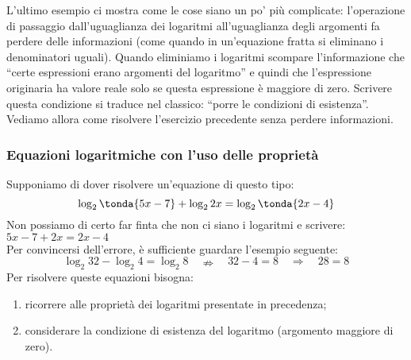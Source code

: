 L'ultimo esempio ci mostra come le cose siano un po' più complicate: 
l'operazione di passaggio dall'uguaglianza dei logaritmi all'uguaglianza 
degli argomenti fa perdere delle informazioni (come quando in un'equazione 
fratta si eliminano i denominatori uguali). 
Quando eliminiamo i logaritmi scompare l'informazione che ``certe 
espressioni erano argomenti del logaritmo'' e quindi che l'espressione 
originaria ha valore reale solo se questa espressione è maggiore di zero. 
Scrivere questa condizione si traduce nel classico: ``porre le condizioni 
di esistenza''.
Vediamo allora come risolvere l'esercizio precedente senza perdere 
informazioni.



\subsubsection{Equazioni logaritmiche con l'uso delle proprietà}
\label{subsubsec:esplog_eq_log_proprieta}

\noindent Supponiamo di dover risolvere un'equazione di questo tipo:
\[\log_2\tonda{5x -7} + \log_2{2x}= \log_2\tonda{2x -4}\]
Non possiamo di certo far finta che non ci siano i logaritmi e scrivere:
\(5x -7 + 2x = 2x -4\)\\
Per convincersi dell'errore, è sufficiente guardare l'esempio seguente:
\[\log_2 32 -\log_2 4 = \log_2 8 \quad \nRightarrow\quad 32 -4 = 8 \quad 
\Rightarrow\quad 28 = 8\]
Per risolvere queste equazioni bisogna:
\begin{enumerate} [noitemsep]
 \item ricorrere alle proprietà dei logaritmi presentate in precedenza;
 \item considerare la condizione di esistenza del logaritmo 
 (argomento maggiore di zero).
\end{enumerate}


